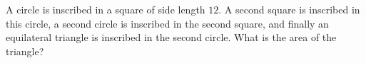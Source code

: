 A circle is inscribed in a square of side length $12$. A second square is inscribed in this circle, a second circle is inscribed in the second square, and finally an equilateral triangle is inscribed in the second circle. What is the area of the triangle?
